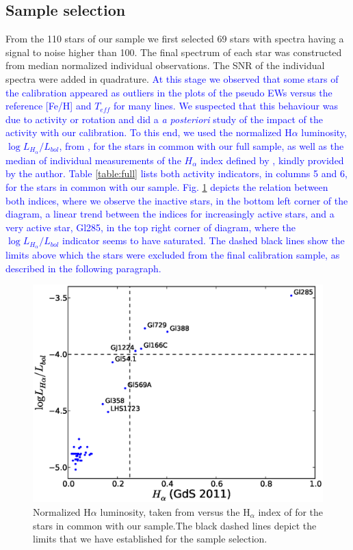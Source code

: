 \documentclass{aa}
\begin{document}

\subsection{Sample selection} 
\label{sec:sample}

From the 110 stars of our sample we first selected 69 stars with spectra having a signal to noise higher than 100. The final spectrum of each star was constructed from median normalized individual observations. The SNR of the individual spectra were added in quadrature. \textcolor{blue}{ At this stage we observed that some stars of the calibration appeared as outliers in the plots of the pseudo EWs versus the reference [Fe/H] and $T_{eff}$ for many lines. We suspected that this behaviour was due to activity or rotation and did a \textit{a posteriori} study of the impact of the activity with our calibration. To this end, we used the normalized H$\alpha$ luminosity, $\log{L_{H_{\alpha}}/L_{bol}}$, from \citet{Reiners-2012}, for the stars in common with our full sample, as well as the median of individual measurements of the $H_{\alpha}$ index defined by \citet{Gomes_da_Silva-2011}, kindly provided by the author. Table \ref{table:full} lists both activity indicators, in columns 5 and 6, for the stars in common with our sample. Fig. \ref{fig:activity} depicts the relation between both indices, where we observe the inactive stars, in the bottom left corner of the diagram, a linear trend between the indices for increasingly active stars, and a very active star, Gl285, in the top right corner of diagram, where the  $\log{L_{H_{\alpha}}/L_{bol}}$ indicator seems to have saturated. The dashed black lines show the limits above which the stars were excluded from the final calibration sample, as described in the following paragraph. 
}

\begin{figure}[b]
\centering
\includegraphics[scale=0.45]{pics/activity.eps}
\caption{Normalized H$\alpha$ luminosity, taken from \citet{Reiners-2012} versus the H$_{\alpha}$ index of \citet{Gomes_da_Silva-2011} for the stars in common with our sample.The black dashed lines depict the limits that we have established for the sample selection.}
\label{fig:activity}
\end{figure}
\end{document}
